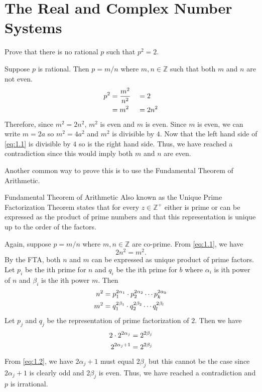 \chapter{The Real and Complex Number Systems}
\label{ch1}

Prove that there is no rational \(p\) such that \(p^2 = 2\).
\par\smallskip
Suppose \(p\) is rational. Then \(p = m/n\) where \(m, n\in\mathbb{Z}\) such that both \(m\) and \(n\) are not even.
\begin{alignat}{3}
	p^2 &= \frac{m^2}{n^2} &&= 2\notag\\
	&= m^2 &&= 2n^2 \label{eq:1.1}
\end{alignat}
Therefore, since \(m^2 = 2n^2\), \(m^2\) is even and \(m\) is even. Since \(m\) is even, we can write \(m = 2a\) so
\(m^2 = 4a^2\) and \(m^2\) is divisible by \(4\). Now that the left hand side of \cref{eq:1.1} is divisible by 
\(4\) so is the right hand side. Thus, we have reached a contradiction since this would imply both \(m\) and \(n\) 
are even.
\par\smallskip
Another common way to prove this is to use the Fundamental Theorem of Arithmetic.
\begin{Theorems}{Fundamental Theorem of Arithmetic}{}
	Also known as the Unique Prime Factorization Theorem states that for every \(z\in\mathbb{Z}^+\) either is prime
	or can be expressed as the product of prime numbers and that this representation is unique up to the order of
	the factors.
\end{Theorems}
\noindent
Again, suppose \(p = m / n\) where \(m, n\in\mathbb{Z}\) are co-prime. From \cref{eq:1.1}, we have
\[
	2n^2 = m^2.
\]
By the FTA, both \(n\) and \(m\) can be expressed as unique product of prime factors. Let \(p_i\) be the ith prime 
for \(n\) and \(q_i\) be the ith prime for \(b\) where \(\alpha_i\) is ith power of \(n\) and \(\beta_i\) is the ith power 
\(m\). Then
\begin{align}
	n^2 &= p_1^{2\alpha_1}\cdot  p_2^{2\alpha_2}\cdots  p_k^{2\alpha_k}\notag\\
	m^2 &= q_1^{2\beta_1}\cdot  q_2^{2\beta_2}\cdots  q_l^{2\beta_l}\notag
\end{align}
Let \(p_j\) and \(q_j\) be the representation of prime factorization of \(2\). Then we have
\begin{alignat}{2}
	2\cdot 2^{2\alpha_j} &= 2^{2\beta_j}\notag\\
	2^{2\alpha_j + 1} &= 2^{2\beta_j}\label{eq:1.2}
\end{alignat}
From \cref{eq:1.2}, we have \(2\alpha_j + 1\) must equal \(2\beta_j\) but this cannot be the case since 
\(2\alpha_j + 1\) is clearly odd and \(2\beta_j\) is even. Thus, we have reached a contradiction and \(p\) is irrational.